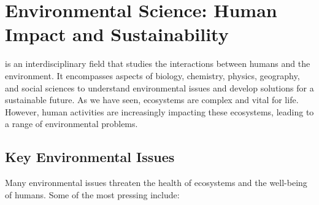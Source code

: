 \section{Environmental Science: Human Impact and Sustainability}

 is an interdisciplinary field that studies the interactions between humans and the environment. It encompasses aspects of biology, chemistry, physics, geography, and social sciences to understand environmental issues and develop solutions for a sustainable future.  As we have seen, ecosystems are complex and vital for life. However, human activities are increasingly impacting these ecosystems, leading to a range of environmental problems.

\subsection{Key Environmental Issues}

Many environmental issues threaten the health of ecosystems and the well-being of humans. Some of the most pressing include:

